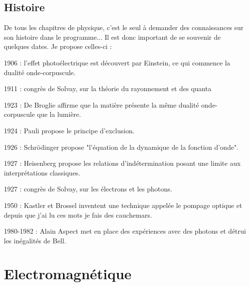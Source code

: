 \documentclass[a4paper,12pt]{book}
\begin{document}
\subsection{Histoire}
De tous les chapitres de physique, c'est le seul à demander des connaissances sur son histoire dans le programme... Il est donc important de se souvenir de quelques dates. Je propose celles-ci :
\par 1906 : l'effet photoélectrique est découvert par Einstein, ce qui commence la dualité onde-corpuscule.
\par 1911 : congrès de Solvay, sur la théorie du rayonnement et des quanta
\par 1923 : De Broglie affirme que la matière présente la même dualité onde-corpuscule que la lumière.
\par 1924 : Pauli propose le principe d'exclusion.
\par 1926 : Schrödinger propose "l'équation de la dynamique de la fonction d'onde".
\par 1927 : Heisenberg propose les relations d'indétermination posant une limite aux interprétations classiques.
\par 1927 : congrès de Solvay, sur les électrons et les photons.
\par 1950 : Kastler et Brossel inventent une technique appelée le pompage optique et depuis que j'ai lu ces mots je fais des cauchemars.
\par 1980-1982 : Alain Aspect met en place des expériences avec des photons et détrui les inégalités de Bell.



\newpage
\section{Electromagnétique}
\end{document}
